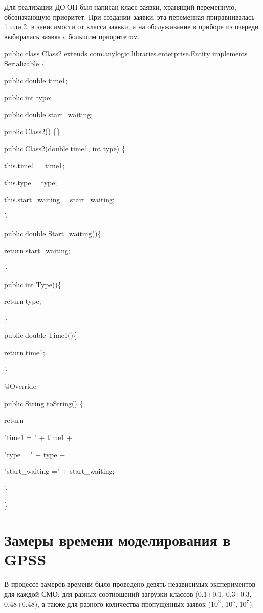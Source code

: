 \documentclass[a4paper,14pt]{report} %
\begin{document}
Для реализации ДО ОП был написан класс заявки, хранящий переменную, обозначающую приоритет. При создании заявки, эта переменная приравнивалась 1 или 2, в зависимости от класса заявки, а на обслуживание в приборе из очереди выбиралась заявка с большим приоритетом. 
\vspace{0.5cm} \par\noindent
public class Class2 extends com.anylogic.libraries.enterprise.Entity implements Serializable \{\par\noindent
public double time1;\par\noindent
public int type;\par\noindent
public double start\_waiting;\par\noindent
public Class2() \{\}\par\noindent
public Class2(double time1, int type) \{\par
this.time1 = time1;\par
this.type = type;\par\noindent
this.start\_waiting = start\_waiting;\par\noindent
\} \par\noindent
public double Start\_waiting()\{\par
return start\_waiting;\par\noindent
\}\par\noindent
public int Type()\{\par
return type;\par\noindent
\}\par\noindent
public double Time1()\{\par
return time1;\par\noindent
\}\par\noindent
@Override\par\noindent
public String toString() \{\par
return  \par
"time1 = " + time1 + \par
"type = " + type + \par
"start\_waiting =" + start\_waiting; \par
\}\par\noindent
\}\par
\section{Замеры времени моделирования в GPSS}
В процессе замеров времени было проведено девять независимых экспериментов для каждой СМО: для разных соотношений загрузки классов (0.1+0.1, 0.3+0.3, 0.48+0.48), а также для разного количества пропущенных заявок ($10^3$, $10^5$, $10^7$).
\end{document}
